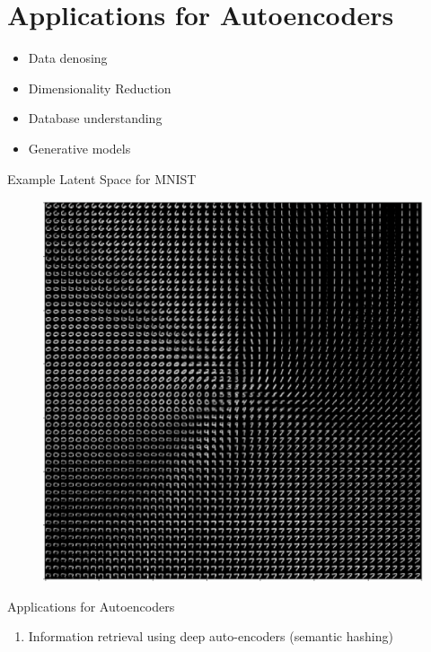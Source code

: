 \documentclass[xcolor=pdftex,dvipsnames,table,mathserif]{beamer}
\begin{document}
\section{Applications for Autoencoders}

\begin{frame}
\begin{itemize}
\item Data denosing
\item Dimensionality Reduction
\item Database understanding
\item Generative models
\end{itemize}
\end{frame}


\begin{frame}{Example Latent Space for MNIST}
\begin{figure}
\includegraphics[width=.75\columnwidth]{../graphics/LatentMNIST}
\end{figure}
\end{frame}






\begin{frame}{Applications for Autoencoders}
\begin{enumerate}
\item Information retrieval using deep auto-encoders (semantic hashing)
\end{enumerate}
\end{frame}
\end{document}
